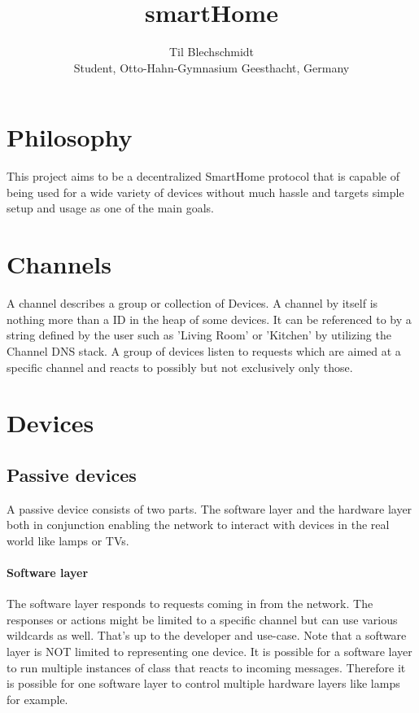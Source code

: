 \documentclass[a4paper]{article}
\title{}
\author{}
\title{smartHome}
\author{Til Blechschmidt\\ Student, Otto-Hahn-Gymnasium Geesthacht, Germany}
\begin{document}
	\maketitle
	\newpage
	
	\tableofcontents
	\listoffigures
	\listoftables
	\newpage
	
	

    \section{Philosophy}
        This project aims to be a decentralized SmartHome protocol that is capable of being used for a wide variety of
        devices without much hassle and targets simple setup and usage as one of the main goals.
	\section{Channels}
	    A channel describes a group or collection of Devices. A channel by itself is nothing more than a ID in the
	    heap of some devices. It can be referenced to by a string defined by the user such as 'Living Room' or 'Kitchen'
	    by utilizing the Channel DNS stack. A group of devices listen to requests which are aimed at a specific channel
	    and reacts to possibly but not exclusively only those.
	\section{Devices}
	    \subsection{Passive devices}
            A passive device consists of two parts. The software layer and the hardware layer both in conjunction
            enabling the network to interact with devices in the real world like lamps or TVs.
            \paragraph{Software layer} The software layer responds to requests coming in from the network. The responses or
                actions might be limited to a specific channel but can use various wildcards as well. That's up to the
                developer and use-case. Note that a software layer is NOT limited to representing one device. It is possible
                for a software layer to run multiple instances of class that reacts to incoming messages. Therefore it is
                possible for one software layer to control multiple hardware layers like lamps for example.
\end{document}
